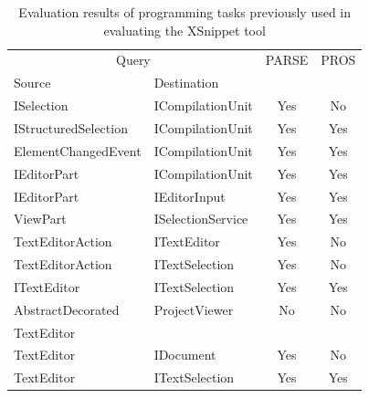 \documentclass{fp035-thummalapenta}
\begin{document}
\begin{table}[t]
\begin{SmallOut}
\begin{CodeOut}
\begin{center}
\centering \caption {\label{table:evaluation} Evaluation results of
programming tasks previously used in evaluating the XSnippet
tool}
\begin {tabular} {|l|l|c|c|}
\hline \multicolumn{2}{|c|}{Query}&PARSE&PROS\\
\cline{1-2}
Source&Destination&&\\
\hline
\hline ISelection&ICompilationUnit&Yes&No\\
\hline IStructuredSelection&ICompilationUnit&Yes&Yes\\
\hline ElementChangedEvent&ICompilationUnit&Yes&Yes\\
\hline IEditorPart&ICompilationUnit&Yes&Yes\\
\hline IEditorPart&IEditorInput&Yes&Yes\\
\hline ViewPart&ISelectionService&Yes&Yes\\
\hline TextEditorAction&ITextEditor&Yes&No\\
\hline TextEditorAction&ITextSelection&Yes&No\\
\hline ITextEditor&ITextSelection&Yes&Yes\\
\hline AbstractDecorated&ProjectViewer&No&No\\
             TextEditor&&&\\
\hline TextEditor&IDocument&Yes&No\\
\hline TextEditor&ITextSelection&Yes&Yes\\
\hline
\end{tabular}
\end{center}
\end{CodeOut}
\end{SmallOut}
\vspace*{-6ex}
\end{table}
\end{document}
